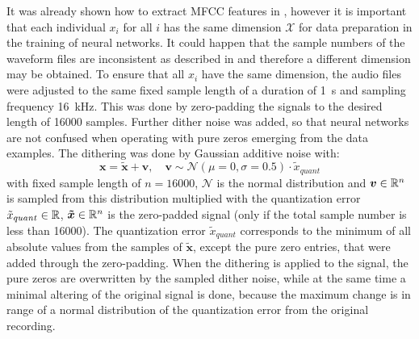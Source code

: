 It was already shown how to extract MFCC features in , however it is important that each individual $x_i$ for all $i$ has the same dimension $\mathcal{X}$ for data preparation in the training of neural networks.
It could happen that the sample numbers of the waveform files are inconsistent as described in  and therefore a different dimension may be obtained.
To ensure that all $x_i$ have the same dimension, the audio files were adjusted to the same fixed sample length of a duration of \SI{1}{\second} and sampling frequency \SI{16}{\kilo\hertz}.
This was done by zero-padding the signals to the desired length of 16000 samples.
Further dither noise was added, so that neural networks are not confused when operating with pure zeros emerging from the data examples.
The dithering was done by Gaussian additive noise with:
\begin{equation}\label{eq:exp_dither}
  \bm{x} = \bm{\tilde{x}} + \bm{v}, \quad \bm{v} \sim \mathcal{N}(\mu=0, \sigma=0.5) \cdot \tilde{x}_{quant}
\end{equation}
with fixed sample length of $n = 16000$, $\mathcal{N}$ is the normal distribution and $\bm{v} \in \mathbb{R}^n$ is sampled from this distribution multiplied with the quantization error $\tilde{x}_{quant} \in \mathbb{R}$, $\bm{\tilde{x}} \in \mathbb{R}^n$ is the zero-padded signal (only if the total sample number is less than 16000).
The quantization error $\tilde{x}_{quant}$ corresponds to the minimum of all absolute values from the samples of $\bm{\tilde{x}}$, except the pure zero entries, that were added through the zero-padding.
When the dithering is applied to the signal, the pure zeros are overwritten by the sampled dither noise, while at the same time a minimal altering of the original signal is done, because the maximum change is in range of a normal distribution of the quantization error from the original recording.
